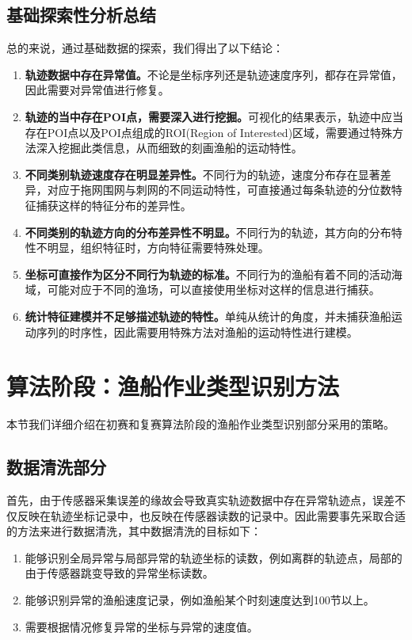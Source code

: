 \documentclass[UTF8, 12pt]{ctexart}
\begin{document}
	\subsection{基础探索性分析总结}
	总的来说，通过基础数据的探索，我们得出了以下结论：
	\begin{enumerate}
		\item \textbf{轨迹数据中存在异常值。}不论是坐标序列还是轨迹速度序列，都存在异常值，因此需要对异常值进行修复。
		\item \textbf{轨迹的当中存在POI点，需要深入进行挖掘。}可视化的结果表示，轨迹中应当存在POI点以及POI点组成的ROI(Region of Interested)区域，需要通过特殊方法深入挖掘此类信息，从而细致的刻画渔船的运动特性。
		\item \textbf{不同类别轨迹速度存在明显差异性。}不同行为的轨迹，速度分布存在显著差异，对应于拖网围网与刺网的不同运动特性，可直接通过每条轨迹的分位数特征捕获这样的特征分布的差异性。
		\item \textbf{不同类别的轨迹方向的分布差异性不明显。}不同行为的轨迹，其方向的分布特性不明显，组织特征时，方向特征需要特殊处理。
		\item \textbf{坐标可直接作为区分不同行为轨迹的标准。}不同行为的渔船有着不同的活动海域，可能对应于不同的渔场，可以直接使用坐标对这样的信息进行捕获。
		\item \textbf{统计特征建模并不足够描述轨迹的特性。}单纯从统计的角度，并未捕获渔船运动序列的时序性，因此需要用特殊方法对渔船的运动特性进行建模。
	\end{enumerate}




	\section{算法阶段：渔船作业类型识别方法}\label{sec_2}
		本节我们详细介绍在初赛和复赛算法阶段的渔船作业类型识别部分采用的策略。

		\subsection{数据清洗部分}
		首先，由于传感器采集误差的缘故会导致真实轨迹数据中存在异常轨迹点，误差不仅反映在轨迹坐标记录中，也反映在传感器读数的记录中。因此需要事先采取合适的方法来进行数据清洗，其中数据清洗的目标如下：
		\begin{enumerate}
			\item 能够识别全局异常与局部异常的轨迹坐标的读数，例如离群的轨迹点，局部的由于传感器跳变导致的异常坐标读数。
			\item 能够识别异常的渔船速度记录，例如渔船某个时刻速度达到100节以上。
			\item 需要根据情况修复异常的坐标与异常的速度值。
		\end{enumerate}
\end{document}
